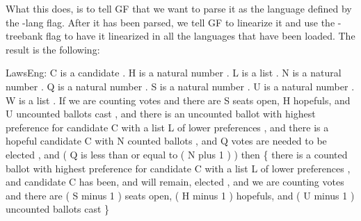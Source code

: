 What this does, is to tell GF that we want to parse it as the language defined by the -lang flag. After it has been parsed, we tell GF to linearize it  and use the -treebank flag to have it linearized in all the languages that have been loaded. The result is the following:
\begin{texto2}
LawsEng: C is a candidate . H is a natural number . L is a list . N is a natural number . Q is a natural number . S is a natural number . U is a natural number . W is a list . If we are counting votes and there are S seats open, H hopefuls, and U uncounted ballots cast , and there is an uncounted ballot with highest preference for candidate C with a list L of lower preferences , and there is a hopeful candidate C with N counted ballots , and Q votes are needed to be elected , and ( Q is less than or equal to ( N plus 1 ) ) then \{ there is a counted ballot with highest preference for candidate C with a list L of lower preferences , and candidate C has been, and will remain, elected , and we are counting votes and there are ( S minus 1 ) seats open, ( H minus 1 ) hopefuls, and ( U minus 1 ) uncounted ballots cast \}
\end{texto2}